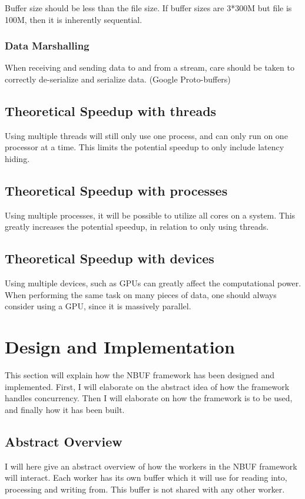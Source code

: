 \documentclass[a4paper]{article}
\begin{document}
Buffer size should be less than the file size. If buffer sizes are 3*300M but file is 100M,
then it is inherently sequential.



\subsubsection{Data Marshalling}
When receiving and sending data to and from a stream, care should be taken to correctly de-serialize and serialize data.
(Google Proto-buffers)



\subsection{Theoretical Speedup with threads}
Using multiple threads will still only use one process, and can only run on one processor at a time. This limits
the potential speedup to only include latency hiding.



\subsection{Theoretical Speedup with processes}
Using multiple processes, it will be possible to utilize all cores on a system. This greatly increases the potential speedup,
in relation to only using threads.


\subsection{Theoretical Speedup with devices}
Using multiple devices, such as GPUs can greatly affect the computational power. When performing the same task on many pieces
of data, one should always consider using a GPU, since it is massively parallel.



\newpage
\section{Design and Implementation}
This section will explain how the NBUF framework has been designed and implemented. First, I will elaborate on
the abstract idea of how the framework handles concurrency. Then I will elaborate on how the framework is to be used,
and finally how it has been built.


\subsection{Abstract Overview}
I will here give an abstract overview of how the workers in the NBUF framework will interact. Each worker has its own buffer which
it will use for reading into, processing and writing from. This buffer is not shared with any other worker.\\\\
\end{document}
